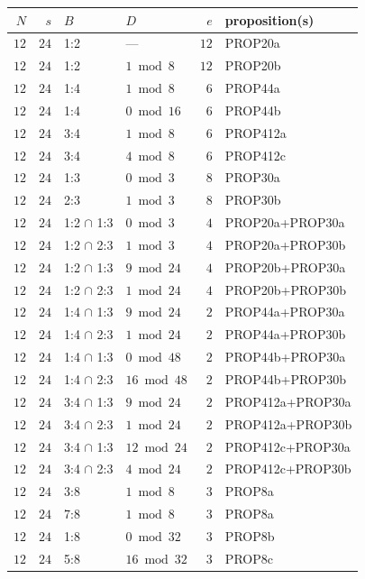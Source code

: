 \documentclass[12pt,twoside,leqno]{article}
\numberwithin{equation}{section}
\begin{document}
\begin{center}
\begin{tabular}{|r|r||l|l||r||l|}\hline
$N$ &  $s$ & $B$          & $D$                            &  $e$ & proposition(s) \\
\hline
$12$ & $24$ & 1:2 & --- & $12$ & PROP20a\\
$12$ & $24$ & 1:2 & $1\bmod 8$ & $12$ & PROP20b\\
$12$ & $24$ & 1:4 & $1\bmod 8$ & $6$ & PROP44a\\
$12$ & $24$ & 1:4 & $0\bmod 16$ & $6$ & PROP44b\\
$12$ & $24$ & 3:4 & $1\bmod 8$ & $6$ & PROP412a\\
$12$ & $24$ & 3:4 & $4\bmod 8$ & $6$ & PROP412c\\
$12$ & $24$ & 1:3 & $0\bmod 3$ & $8$ & PROP30a\\
$12$ & $24$ & 2:3 & $1\bmod 3$ & $8$ & PROP30b\\
$12$ & $24$ & 1:2 $\cap$ 1:3 & $0\bmod 3$ & $4$ & PROP20a+PROP30a\\
$12$ & $24$ & 1:2 $\cap$ 2:3 & $1\bmod 3$ & $4$ & PROP20a+PROP30b\\
$12$ & $24$ & 1:2 $\cap$ 1:3 & $9\bmod 24$ & $4$ & PROP20b+PROP30a\\
$12$ & $24$ & 1:2 $\cap$ 2:3 & $1\bmod 24$ & $4$ & PROP20b+PROP30b\\
$12$ & $24$ & 1:4 $\cap$ 1:3 & $9\bmod 24$ & $2$ & PROP44a+PROP30a\\
$12$ & $24$ & 1:4 $\cap$ 2:3 & $1\bmod 24$ & $2$ & PROP44a+PROP30b\\
$12$ & $24$ & 1:4 $\cap$ 1:3 & $0\bmod 48$ & $2$ & PROP44b+PROP30a\\
$12$ & $24$ & 1:4 $\cap$ 2:3 & $16\bmod 48$ & $2$ & PROP44b+PROP30b\\
$12$ & $24$ & 3:4 $\cap$ 1:3 & $9\bmod 24$ & $2$ & PROP412a+PROP30a\\
$12$ & $24$ & 3:4 $\cap$ 2:3 & $1\bmod 24$ & $2$ & PROP412a+PROP30b\\
$12$ & $24$ & 3:4 $\cap$ 1:3 & $12\bmod 24$ & $2$ & PROP412c+PROP30a\\
$12$ & $24$ & 3:4 $\cap$ 2:3 & $4\bmod 24$ & $2$ & PROP412c+PROP30b\\
\hline
$12$ & $24$ & 3:8 & $1\bmod 8$ & $3$ & PROP8a\\
$12$ & $24$ & 7:8 & $1\bmod 8$ & $3$ & PROP8a\\
$12$ & $24$ & 1:8 & $0\bmod 32$ & $3$ & PROP8b\\
$12$ & $24$ & 5:8 & $16\bmod 32$ & $3$ & PROP8c\\

\end{tabular}
\end{center}
\end{document}
